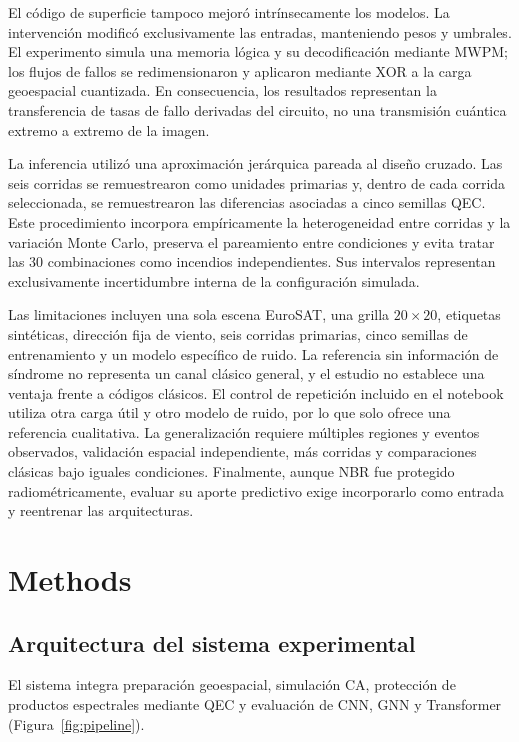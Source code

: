 \documentclass[fleqn,10pt]{wlscirep}
\begin{document}
El código de superficie tampoco mejoró intrínsecamente los modelos. La intervención modificó exclusivamente las entradas, manteniendo pesos y umbrales. El experimento simula una memoria lógica y su decodificación mediante MWPM; los flujos de fallos se redimensionaron y aplicaron mediante XOR a la carga geoespacial cuantizada. En consecuencia, los resultados representan la transferencia de tasas de fallo derivadas del circuito, no una transmisión cuántica extremo a extremo de la imagen.

La inferencia utilizó una aproximación jerárquica pareada al diseño cruzado. Las seis corridas se remuestrearon como unidades primarias y, dentro de cada corrida seleccionada, se remuestrearon las diferencias asociadas a cinco semillas QEC. Este procedimiento incorpora empíricamente la heterogeneidad entre corridas y la variación Monte Carlo, preserva el pareamiento entre condiciones y evita tratar las 30 combinaciones como incendios independientes. Sus intervalos representan exclusivamente incertidumbre interna de la configuración simulada.

Las limitaciones incluyen una sola escena EuroSAT, una grilla $20\times20$, etiquetas sintéticas, dirección fija de viento, seis corridas primarias, cinco semillas de entrenamiento y un modelo específico de ruido. La referencia sin información de síndrome no representa un canal clásico general, y el estudio no establece una ventaja frente a códigos clásicos. El control de repetición incluido en el notebook utiliza otra carga útil y otro modelo de ruido, por lo que solo ofrece una referencia cualitativa. La generalización requiere múltiples regiones y eventos observados, validación espacial independiente, más corridas y comparaciones clásicas bajo iguales condiciones. Finalmente, aunque NBR fue protegido radiométricamente, evaluar su aporte predictivo exige incorporarlo como entrada y reentrenar las arquitecturas.

\section*{Methods}

\subsection*{Arquitectura del sistema experimental}

El sistema integra preparación geoespacial, simulación CA, protección de productos espectrales mediante QEC y evaluación de CNN, GNN y Transformer (Figura~\ref{fig:pipeline}).
\end{document}
